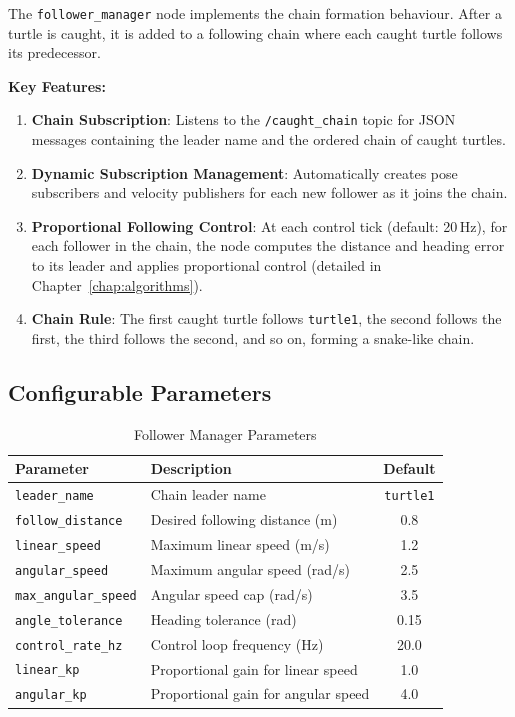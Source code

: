 The \texttt{follower\_manager} node implements the chain formation behaviour. After a turtle is caught, it is added to a following chain where each caught turtle follows its predecessor.

\textbf{Key Features:}

\begin{enumerate}
  \item \textbf{Chain Subscription}: Listens to the \texttt{/caught\_chain} topic for JSON messages containing the leader name and the ordered chain of caught turtles.

  \item \textbf{Dynamic Subscription Management}: Automatically creates pose subscribers and velocity publishers for each new follower as it joins the chain.

  \item \textbf{Proportional Following Control}: At each control tick (default: 20\,Hz), for each follower in the chain, the node computes the distance and heading error to its leader and applies proportional control (detailed in Chapter~\ref{chap:algorithms}).

  \item \textbf{Chain Rule}: The first caught turtle follows \texttt{turtle1}, the second follows the first, the third follows the second, and so on, forming a snake-like chain.
\end{enumerate}

\subsection{Configurable Parameters}

\begin{table}[htbp]
\centering
\caption{Follower Manager Parameters}
\begin{tabular}{llc}
\toprule
\textbf{Parameter} & \textbf{Description} & \textbf{Default} \\
\midrule
\texttt{leader\_name} & Chain leader name & \texttt{turtle1} \\
\texttt{follow\_distance} & Desired following distance (m) & 0.8 \\
\texttt{linear\_speed} & Maximum linear speed (m/s) & 1.2 \\
\texttt{angular\_speed} & Maximum angular speed (rad/s) & 2.5 \\
\texttt{max\_angular\_speed} & Angular speed cap (rad/s) & 3.5 \\
\texttt{angle\_tolerance} & Heading tolerance (rad) & 0.15 \\
\texttt{control\_rate\_hz} & Control loop frequency (Hz) & 20.0 \\
\texttt{linear\_kp} & Proportional gain for linear speed & 1.0 \\
\texttt{angular\_kp} & Proportional gain for angular speed & 4.0 \\
\bottomrule
\end{tabular}
\end{table}

